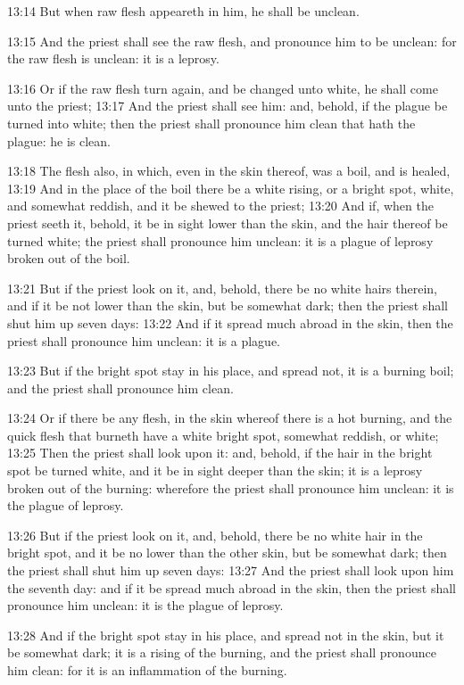 13:14 But when raw flesh appeareth in him, he shall be unclean.

13:15 And the priest shall see the raw flesh, and pronounce him to be unclean: for the raw flesh is unclean: it is a leprosy.

13:16 Or if the raw flesh turn again, and be changed unto white, he shall come unto the priest; 13:17 And the priest shall see him: and, behold, if the plague be turned into white; then the priest shall pronounce him clean that hath the plague: he is clean.

13:18 The flesh also, in which, even in the skin thereof, was a boil, and is healed, 13:19 And in the place of the boil there be a white rising, or a bright spot, white, and somewhat reddish, and it be shewed to the priest; 13:20 And if, when the priest seeth it, behold, it be in sight lower than the skin, and the hair thereof be turned white; the priest shall pronounce him unclean: it is a plague of leprosy broken out of the boil.

13:21 But if the priest look on it, and, behold, there be no white hairs therein, and if it be not lower than the skin, but be somewhat dark; then the priest shall shut him up seven days: 13:22 And if it spread much abroad in the skin, then the priest shall pronounce him unclean: it is a plague.

13:23 But if the bright spot stay in his place, and spread not, it is a burning boil; and the priest shall pronounce him clean.

13:24 Or if there be any flesh, in the skin whereof there is a hot burning, and the quick flesh that burneth have a white bright spot, somewhat reddish, or white; 13:25 Then the priest shall look upon it: and, behold, if the hair in the bright spot be turned white, and it be in sight deeper than the skin; it is a leprosy broken out of the burning: wherefore the priest shall pronounce him unclean: it is the plague of leprosy.

13:26 But if the priest look on it, and, behold, there be no white hair in the bright spot, and it be no lower than the other skin, but be somewhat dark; then the priest shall shut him up seven days: 13:27 And the priest shall look upon him the seventh day: and if it be spread much abroad in the skin, then the priest shall pronounce him unclean: it is the plague of leprosy.

13:28 And if the bright spot stay in his place, and spread not in the skin, but it be somewhat dark; it is a rising of the burning, and the priest shall pronounce him clean: for it is an inflammation of the burning.

